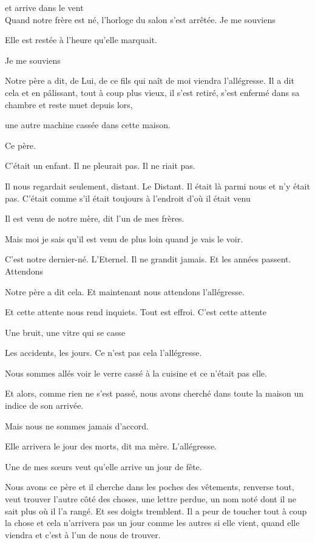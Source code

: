 et arrive dans le vent\\

Quand notre frère est né, l'horloge du salon s'est arrêtée. Je me
souviens

Elle est restée à l'heure qu'elle marquait.

Je me souviens

Notre père a dit, de Lui, de ce fils qui naît de moi viendra
l'allégresse. Il a dit cela et en pâlissant, tout à coup plus vieux, il
s'est retiré, s'est enfermé dans sa chambre et reste muet depuis lors,

une autre machine cassée dans cette maison.

Ce père.

C'était un enfant. Il ne pleurait pas. Il ne riait pas.

Il nous regardait seulement, distant. Le Distant. Il était là parmi nous
et n'y était pas. C'était comme s'il était toujours à l'endroit d'où il
était venu

Il est venu de notre mère, dit l'un de mes frères.

Mais moi je sais qu'il est venu de plus loin quand je vais le voir.

C'est notre dernier-né. L'Eternel. Il ne grandit jamais. Et les années
passent. Attendons

Notre père a dit cela. Et maintenant nous attendons l'allégresse.

Et cette attente nous rend inquiets. Tout est effroi. C'est cette
attente

Une bruit, une vitre qui se casse

Les accidents, les jours. Ce n'est pas cela l'allégresse.

Nous sommes allés voir le verre cassé à la cuisine et ce n'était pas
elle.

Et alors, comme rien ne s'est passé, nous avons cherché dans toute la
maison un indice de son arrivée.

Mais nous ne sommes jamais d'accord.

Elle arrivera le jour des morts, dit ma mère. L'allégresse.

Une de mes sœurs veut qu'elle arrive un jour de fête.

Nous avons ce père et il cherche dans les poches des vêtements, renverse
tout, veut trouver l'autre côté des choses, une lettre perdue, un nom
noté dont il ne sait plus où il l'a rangé. Et ses doigts tremblent. Il a
peur de toucher tout à coup la chose et cela n'arrivera pas un jour
comme les autres si elle vient, quand elle viendra et c'est à l'un de
nous de trouver.

